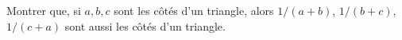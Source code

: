 Montrer que, si $a, b, c$ sont les côtés d'un triangle, alors $1/(a + b)$, $1/(b + c)$, $1/(c + a)$ sont aussi les côtés d'un triangle.

